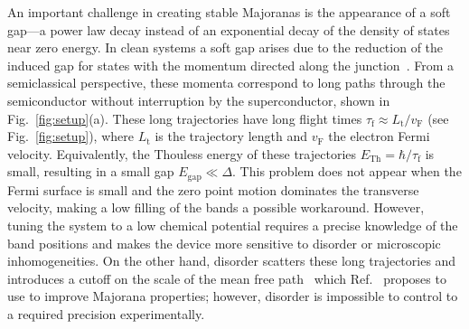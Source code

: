 An important challenge in creating stable Majoranas is the appearance of a soft gap---a power law decay instead of an exponential decay of the density of states near zero energy.
In clean systems a soft gap arises due to the reduction of the induced gap for states with the momentum directed along the junction~\cite{Gennes1963,Beenakker2005}.
From a semiclassical perspective, these momenta correspond to long paths through the semiconductor without interruption by the superconductor, shown in Fig.~\ref{fig:setup}(a).
These long trajectories have long flight times $\tau_\textrm{f} \approx L_\textrm{t} / v_\textrm{F}$ (see Fig.~\ref{fig:setup}), where $L_\textrm{t}$ is the trajectory length and $v_\textrm{F}$ the electron Fermi velocity.
Equivalently, the Thouless energy of these trajectories $E_{\textrm{Th}}=\hbar / \tau_\textrm{f}$ is small, resulting in a small gap $E_\textrm{gap} \ll \Delta$.
This problem does not appear when the Fermi surface is small and the zero point motion dominates the transverse velocity, making a low filling of the bands a possible workaround\cite{Beenakker2005,Nijholt2016}.
However, tuning the system to a low chemical potential requires a precise knowledge of the band positions and makes the device more sensitive to disorder or microscopic inhomogeneities.
On the other hand, disorder scatters these long trajectories and introduces a cutoff on the scale of the mean free path~\cite{Golubov1988,Belzig1996,Pilgram2000} which Ref.~\cite{Haim2019} proposes to use to improve Majorana properties; however, disorder is impossible to control to a required precision experimentally.

